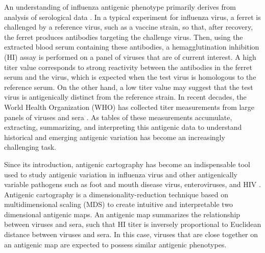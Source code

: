 \documentclass[11pt,oneside,letterpaper]{article}
\begin{document}
An understanding of influenza antigenic phenotype primarily derives from analysis of serological data \cite{smith_mapping_2004}. 
In a typical experiment for influenza virus, a ferret is challenged by a reference virus, such as a vaccine strain, so that, after recovery, the ferret produces antibodies targeting the challenge virus. 
Then, using the extracted blood serum containing these antibodies, a hemagglutination inhibition (HI) assay is performed on a panel of viruses that are of current interest. 
A high titer value corresponds to strong reactivity between the antibodies in the ferret serum and the virus, which is expected when the test virus is homologous to the reference serum.
On the other hand, a low titer value may suggest that the test virus is antigenically distinct from the reference strain. 
In recent decades, the World Health Organization (WHO) has collected titer measurements from large panels of viruses and sera \cite{smith_mapping_2004, russell_global_2008}. 
As tables of these measurements accumulate, extracting, summarizing, and interpreting this antigenic data to understand historical and emerging antigenic variation has become an increasingly challenging task. %

Since its introduction, antigenic cartography \cite{smith_mapping_2004, cai_computational_2010} has become an indispensable tool used to study antigenic variation in influenza virus and other antigenically variable pathogens such as foot and mouth disease virus, enteroviruses, and HIV \cite{smith_mapping_2004, jong_antigenic_2007, ludi_antigenic_2014, debbink_withinhost_2014, frost_mapping_2013}.
Antigenic cartography is a dimensionality-reduction technique based on multidimensional scaling (MDS) to create intuitive and interpretable two
dimensional antigenic maps. 
An antigenic map summarizes the relationship between viruses and sera, such that HI titer is inversely proportional to Euclidean distance between viruses and sera.
In this case, viruses that are close together on an antigenic map are expected to possess similar antigenic phenotypes. 
\end{document}
